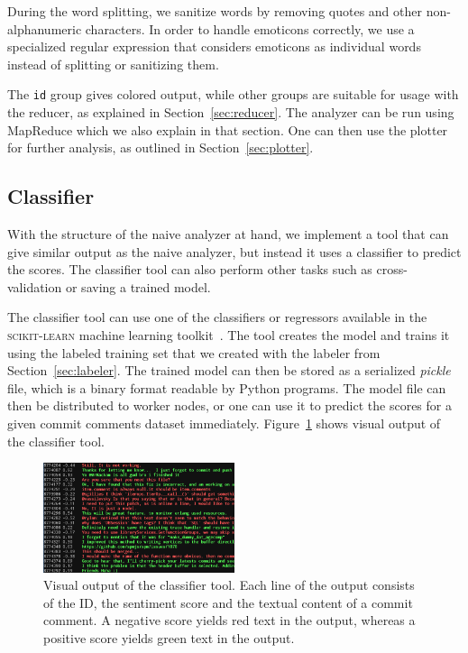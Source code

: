 \documentclass{article}
\begin{document}
During the word splitting, we sanitize words by removing quotes and other 
non-alphanumeric characters. In order to handle emoticons correctly, we use 
a specialized regular expression that considers emoticons as individual words 
instead of splitting or sanitizing them.

The {\tt id} group gives colored output, while other groups are suitable for 
usage with the reducer, as explained in Section~\ref{sec:reducer}. The analyzer
can be run using MapReduce which we also explain in that section. One can then
use the plotter for further analysis, as outlined in Section~\ref{sec:plotter}.

\subsection{Classifier}\label{sec:classifier}
With the structure of the naive analyzer at hand, we implement a tool that can 
give similar output as the naive analyzer, but instead it uses a classifier to
predict the scores. The classifier tool can also perform other tasks such as 
cross-validation or saving a trained model.

The classifier tool can use one of the classifiers or regressors available in
the \textsc{scikit-learn} machine learning toolkit~\cite{scikit-learn}. The tool
creates the model and trains it using the labeled training set that we created
with the labeler from Section~\ref{sec:labeler}. The trained model can then be
stored as a serialized \emph{pickle} file, which is a binary format readable by
Python programs. The model file can then be distributed to worker nodes, or one
can use it to predict the scores for a given commit comments dataset immediately.
Figure~\ref{fig:classifier-output} shows visual output of the classifier tool.

\begin{figure}[h!]
  \centering
  \includegraphics[width=0.5\textwidth]{Images/Classifier.png}
  \caption{Visual output of the classifier tool. Each line of the output
           consists of the ID, the sentiment score and the textual content of
           a commit comment. A negative score yields red text in the output,
           whereas a positive score yields green text in the
           output.}\label{fig:classifier-output}
\end{figure}
\end{document}
